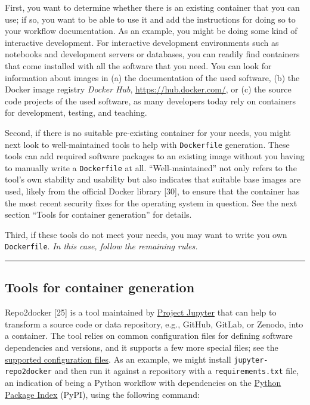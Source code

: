 \documentclass[10pt,letterpaper]{article}
\begin{document}
First, you want to determine whether there is an existing container that
you can use; if so, you want to be able to use it and add the
instructions for doing so to your workflow documentation. As an example,
you might be doing some kind of interactive development. For interactive
development environments such as notebooks and development servers or
databases, you can readily find containers that come installed with all
the software that you need. You can look for information about images in
(a) the documentation of the used software, (b) the Docker image
registry \emph{Docker Hub}, \url{https://hub.docker.com/}, or (c) the
source code projects of the used software, as many developers today rely
on containers for development, testing, and teaching.

Second, if there is no suitable pre-existing container for your needs,
you might next look to well-maintained tools to help with
\texttt{Dockerfile} generation. These tools can add required software
packages to an existing image without you having to manually write a
\texttt{Dockerfile} at all. ``Well-maintained'' not only refers to the
tool's own stability and usability but also indicates that suitable base
images are used, likely from the official Docker library {[}30{]}, to
ensure that the container has the most recent security fixes for the
operating system in question. See the next section ``Tools for container
generation'' for details.

Third, if these tools do not meet your needs, you may want to write you
own \texttt{Dockerfile}. \emph{In this case, follow the remaining
rules.}

\begin{center}\rule{0.5\linewidth}{0.5pt}\end{center}

\hypertarget{tools-for-container-generation}{%
\subsection{Tools for container
generation}\label{tools-for-container-generation}}

Repo2docker {[}25{]} is a tool maintained by
\href{https://jupyter.org/}{Project Jupyter} that can help to transform
a source code or data repository, e.g., GitHub, GitLab, or Zenodo, into
a container. The tool relies on common configuration files for defining
software dependencies and versions, and it supports a few more special
files; see the
\href{https://repo2docker.readthedocs.io/en/latest/config_files.html}{supported
configuration files}. As an example, we might install
\texttt{jupyter-repo2docker} and then run it against a repository with a
\texttt{requirements.txt} file, an indication of being a Python workflow
with dependencies on the \href{https://pypi.org/}{Python Package Index}
(PyPI), using the following command:
\end{document}
